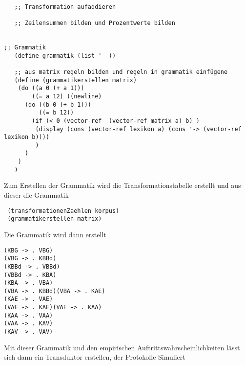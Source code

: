 \documentclass[12pt]{article}
\begin{document}
\begin{verbatim}
   
   ;; Transformation aufaddieren
   
   ;; Zeilensummen bilden und Prozentwerte bilden
  

;; Grammatik
   (define grammatik (list '- ))
   
   ;; aus matrix regeln bilden und regeln in grammatik einfügene 
   (define (grammatikerstellen matrix)
    (do ((a 0 (+ a 1)))
        ((= a 12) )(newline)
      (do ((b 0 (+ b 1)))
          ((= b 12))
        (if (< 0 (vector-ref  (vector-ref matrix a) b) )  
         (display (cons (vector-ref lexikon a) (cons '-> (vector-ref lexikon b))))
         )
      )
    )
   )
\end{verbatim}

Zum Erstellen der Grammatik wird die Transformationstabelle erstellt und aus dieser die Grammatik

\begin{verbatim}
 (transformationenZaehlen korpus)
 (grammatikerstellen matrix)
\end{verbatim}

Die Grammatik wird dann erstellt

\begin{verbatim}
(KBG -> . VBG)
(VBG -> . KBBd)
(KBBd -> . VBBd)
(VBBd -> . KBA)
(KBA -> . VBA)
(VBA -> . KBBd)(VBA -> . KAE)
(KAE -> . VAE)
(VAE -> . KAE)(VAE -> . KAA)
(KAA -> . VAA)
(VAA -> . KAV)
(KAV -> . VAV)

\end{verbatim}

Mit dieser Grammatik und den empirischen Auftrittswahrscheinlichkeiten lässt sich dann ein Transduktor erstellen, der Protokolle Simuliert
\end{document}
